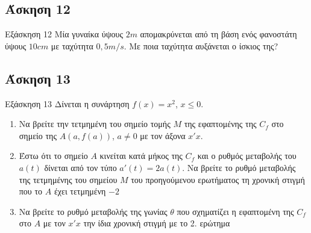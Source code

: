 \documentclass[greek]{beamer}
\begin{document}
\subsection{Άσκηση 12}
\begin{frame}[label=Άσκηση12]{Εξάσκηση 12}
 Μία γυναίκα ύψους $2m$ απομακρύνεται από τη βάση ενός φανοστάτη ύψους $10cm$ με ταχύτητα $0,5m/s$. Με ποια ταχύτητα αυξάνεται ο ίσκιος της?

\end{frame}

\subsection{Άσκηση 13}
\begin{frame}[label=Άσκηση13]{Εξάσκηση 13}
 Δίνεται η συνάρτηση $f(x)=x^2$, $x\le 0$.
 \begin{enumerate}
  \item<1-> Να βρείτε την τετμημένη του σημείο τομής $Μ$ της εφαπτομένης της $C_f$ στο σημείο της $Α(a,f(a))$, $a\ne 0$ με τον άξονα $x'x$.
  \item<2-> Έστω ότι το σημείο $Α$ κινείται κατά μήκος της $C_f$ και ο ρυθμός μεταβολής του $a(t)$ δίνεται από τον τύπο $a'(t)=2a(t)$. Να βρείτε το ρυθμό μεταβολής της τετμημένης του σημείου $Μ$ του προηγούμενου ερωτήματος τη χρονική στιγμή που το $Α$ έχει τετμημένη $-2$
  \item<3-> Να βρείτε το ρυθμό μεταβολής της γωνίας $θ$ που σχηματίζει η εφαπτομένη της $C_f$ στο $Α$ με τον $x'x$ την ίδια χρονική στιγμή με το 2. ερώτημα
 \end{enumerate}

\end{frame}
\end{document}
